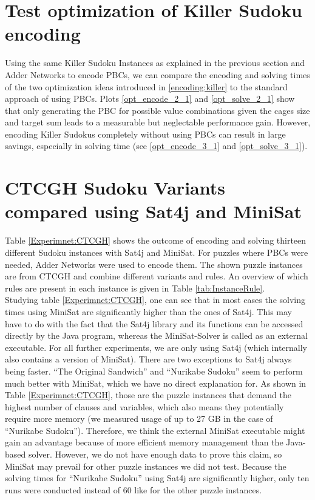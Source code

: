 \section{Test optimization of Killer Sudoku encoding}
Using the same Killer Sudoku Instances as explained in the previous section and Adder Networks to encode PBCs, we can compare the encoding and solving times of the two optimization ideas introduced in \ref{encoding:killer} to the standard approach of using PBCs. Plots \ref{opt_encode_2_1} and \ref{opt_solve_2_1} show that only generating the PBC for possible value combinations given the cages size and target sum leads to a measurable but neglectable performance gain. However, encoding Killer Sudokus completely without using PBCs can result in large savings, especially in solving time (see \ref{opt_encode_3_1} and \ref{opt_solve_3_1}).

\section{CTCGH Sudoku Variants compared using Sat4j and MiniSat}
Table \ref{Experimnet:CTCGH} shows the  outcome of encoding and solving thirteen different Sudoku instances with Sat4j and MiniSat. For puzzles where PBCs were needed, Adder Networks were used to encode them. The shown puzzle instances are from CTCGH and combine different variants and rules. An overview of which rules are present in each instance is given in Table \ref{tab:InstanceRule}.\\

Studying table \ref{Experimnet:CTCGH}, one can see that in most cases the solving times using MiniSat are significantly higher than the ones of Sat4j. This may have to do with the fact that the Sat4j library and its functions can be accessed directly by the Java program, whereas the MiniSat-Solver is called as an external executable. For all further experiments, we are only using Sat4j (which internally also contains a version of MiniSat). There are two exceptions to Sat4j always being faster. ``The Original Sandwich'' and ``Nurikabe Sudoku'' seem to perform much better with MiniSat, which we have no direct explanation for. As shown in Table \ref{Experimnet:CTCGH}, those are the puzzle instances that demand the highest number of clauses and variables, which also means they potentially require more memory (we measured usage of up to 27 GB in the case of ``Nurikabe Sudoku''). Therefore, we think the external MiniSat executable might gain an advantage because of more efficient memory management than the Java-based solver. However, we do not have enough data to prove this claim, so MiniSat may prevail for other puzzle instances we did not test. Because the solving times for ``Nurikabe Sudoku'' using Sat4j are significantly higher, only ten runs were conducted instead of 60 like for the other puzzle instances.\\

